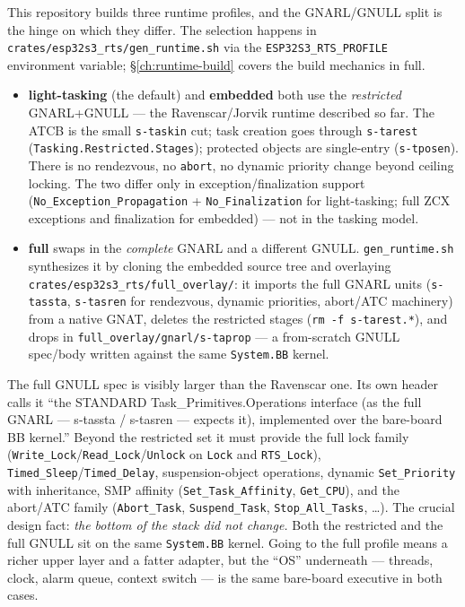 This repository builds three runtime profiles, and the GNARL/GNULL split is the
hinge on which they differ. The selection happens in
\texttt{crates/esp32s3\_rts/gen\_runtime.sh} via the \texttt{ESP32S3\_RTS\_PROFILE}
environment variable; \S\ref{ch:runtime-build} covers the build mechanics in
full.

\begin{itemize}
  \item \textbf{light-tasking} (the default) and \textbf{embedded} both use the
        \emph{restricted} GNARL+GNULL --- the Ravenscar/Jorvik runtime described
        so far. The ATCB is the small \texttt{s-taskin} cut; task creation goes
        through \texttt{s-tarest} (\texttt{Tasking.Restricted.Stages}); protected
        objects are single-entry (\texttt{s-tposen}). There is no rendezvous, no
        \texttt{abort}, no dynamic priority change beyond ceiling locking. The
        two differ only in exception/finalization support
        (\texttt{No\_Exception\_Propagation} + \texttt{No\_Finalization} for
        light-tasking; full ZCX exceptions and finalization for embedded) --- not
        in the tasking model.
  \item \textbf{full} swaps in the \emph{complete} GNARL and a different GNULL.
        \texttt{gen\_runtime.sh} synthesizes it by cloning the embedded source
        tree and overlaying \texttt{crates/esp32s3\_rts/full\_overlay/}: it
        imports the full GNARL units (\texttt{s-tassta}, \texttt{s-tasren} for
        rendezvous, dynamic priorities, abort/ATC machinery) from a native GNAT,
        deletes the restricted stages (\texttt{rm -f s-tarest.*}), and drops in
        \texttt{full\_overlay/gnarl/s-taprop} --- a from-scratch GNULL spec/body
        written against the same \texttt{System.BB} kernel.
\end{itemize}

The full GNULL spec is visibly larger than the Ravenscar one. Its own header
calls it ``the STANDARD Task\_Primitives.Operations interface (as the full GNARL
--- s-tassta / s-tasren --- expects it), implemented over the bare-board BB
kernel.'' Beyond the restricted set it must provide the full lock family
(\texttt{Write\_Lock}/\texttt{Read\_Lock}/\texttt{Unlock} on \texttt{Lock} and
\texttt{RTS\_Lock}), \texttt{Timed\_Sleep}/\texttt{Timed\_Delay},
suspension-object operations, dynamic \texttt{Set\_Priority} with inheritance,
SMP affinity (\texttt{Set\_Task\_Affinity}, \texttt{Get\_CPU}), and the abort/ATC
family (\texttt{Abort\_Task}, \texttt{Suspend\_Task}, \texttt{Stop\_All\_Tasks},
\dots). The crucial design fact: \emph{the bottom of the stack did not change.}
Both the restricted and the full GNULL sit on the same \texttt{System.BB}
kernel. Going to the full profile means a richer upper layer and a fatter
adapter, but the ``OS'' underneath --- threads, clock, alarm queue, context
switch --- is the same bare-board executive in both cases.

